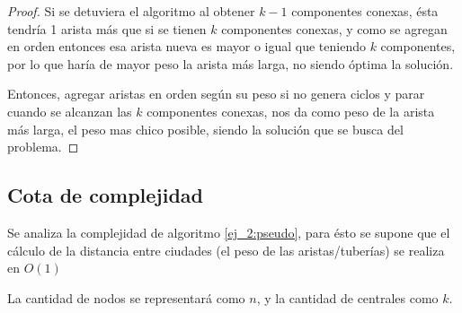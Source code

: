 \begin{proof}
	Si se detuviera el algoritmo al obtener $k - 1$ componentes conexas, \'esta tendr\'ia 1 arista m\'as que si se tienen $k$ componentes conexas, y como se agregan en orden entonces esa arista nueva es mayor o igual que teniendo $k$ componentes, por lo que har\'ia de mayor peso la arista m\'as larga, no siendo \'optima la soluci\'on.

	Entonces, agregar aristas en orden seg\'un su peso si no genera ciclos y parar cuando se alcanzan las $k$ componentes conexas, nos da como peso de la arista m\'as larga, el peso mas chico posible, siendo la soluci\'on que se busca del problema.

\end{proof}

\subsection{Cota de complejidad} \label{ej_2:cota}

Se analiza la complejidad de algoritmo \ref{ej_2:pseudo}, para \'esto se supone que el c\'alculo de la distancia entre ciudades (el peso de las aristas/tuber\'ias) se realiza en $O(1)$

La cantidad de nodos se representar\'a como $n$, y la cantidad de centrales como $k$.

